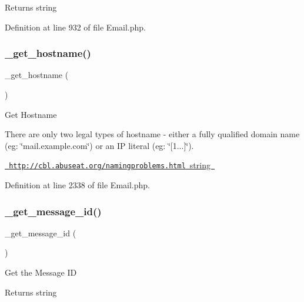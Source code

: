 \begin{DoxyReturn}{Returns}
string 
\end{DoxyReturn}


Definition at line 932 of file Email.\+php.

\mbox{\label{class_c_i___email_ad2d333b7bb9f6c25400714dd8931fe11}} 
\subsubsection{\texorpdfstring{\_get\_hostname()}{\_get\_hostname()}}
{\footnotesize\ttfamily \+\_\+get\+\_\+hostname (\begin{DoxyParamCaption}{ }\end{DoxyParamCaption})\hspace{0.3cm}{\ttfamily [protected]}}

Get Hostname

There are only two legal types of hostname -\/ either a fully qualified domain name (eg\+: \char`\"{}mail.\+example.\+com\char`\"{}) or an IP literal (eg\+: \char`\"{}\mbox{[}1...\mbox{]}\char`\"{}).

\mbox{\hyperlink{}{\href{http://cbl.abuseat.org/namingproblems.html}{\texttt{ http\+://cbl.\+abuseat.\+org/namingproblems.\+html}}  string }}

Definition at line 2338 of file Email.\+php.

\mbox{\label{class_c_i___email_a253c34263736465755f85ec4192aa6b4}} 
\subsubsection{\texorpdfstring{\_get\_message\_id()}{\_get\_message\_id()}}
{\footnotesize\ttfamily \+\_\+get\+\_\+message\+\_\+id (\begin{DoxyParamCaption}{ }\end{DoxyParamCaption})\hspace{0.3cm}{\ttfamily [protected]}}

Get the Message ID

\begin{DoxyReturn}{Returns}
string 
\end{DoxyReturn}


